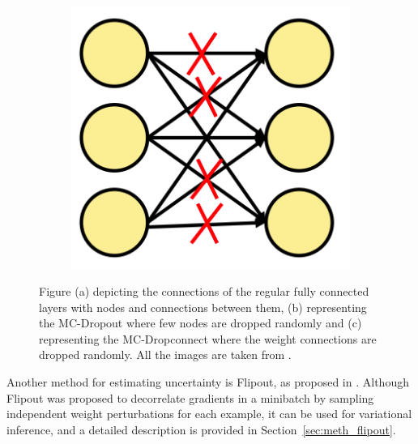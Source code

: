 \begin{figure}[htbp]
\begin{subfigure}{0.33\textwidth}
            \caption{}
            \label{fig:SOTA_Dropout}
        \end{subfigure}
        \begin{subfigure}{0.33\textwidth}
            \centering
            \includegraphics[scale=0.33]{images/DConnect_SOTA.png}
            \caption{}
            \label{fig:SOTA_Dconnect}
        \end{subfigure}
        \caption{Figure (a) depicting the connections of the regular fully connected layers with nodes and connections between them,
        (b) representing the MC-Dropout where few nodes are dropped randomly and 
        (c) representing the MC-Dropconnect where the weight connections are dropped randomly. All the images are taken from \cite{UQ_Survey}.}
        \label{fig:Dropout_Connect}
    \end{figure}
    Another method for estimating uncertainty is Flipout, as proposed in \cite{Flipout}.
    Although Flipout was proposed to decorrelate gradients in a minibatch by sampling independent weight perturbations for each example, it can be used for variational inference, and a detailed description is provided in Section~\ref{sec:meth_flipout}.
    
    
